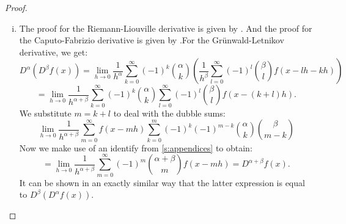 \begin{proof}
\begin{enumerate}[(i)]
        \item The proof for the Riemann-Liouville derivative is given by \cite{koning15}. And the proof for the Caputo-Fabrizio derivative is given by \cite{losada15}.For the Grünwald-Letnikov derivative, we get:
        \[ D^\alpha(D^\beta f(x)) = \lim_{h \to 0} \frac{1}{h^\alpha} \sum_{k=0}^\infty (-1)^k \binom{\alpha}{k}(  \frac{1}{h^\beta} \sum_{l=0}^\infty (-1)^l \binom{\beta}{l} f(x - l h - kh))\]
        \[= \lim_{h \to 0} \frac{1}{h^{\alpha + \beta}} \sum_{k=0}^\infty (-1)^k \binom{\alpha}{k} \sum_{l=0}^\infty (-1)^l \binom{\beta}{l} f(x - (k + l)h).\] We substitute \(m = k + l\) to deal with the dubble sums: 
        \[ \lim_{h \to 0} \frac{1}{h^{\alpha + \beta}} \sum_{m=0}^\infty f(x - mh)  \sum_{k=0}^m (-1)^k (-1)^{ m - k} \binom{\alpha}{k} \binom{\beta}{m - k}\] Now we make use of an identify from \ref{s:appendices} to obtain:
        \[ = \lim_{h \to 0} \frac{1}{h^{\alpha + \beta}} \sum_{m=0}^\infty (-1)^m \binom{\alpha + \beta}{m} f(x - mh) = D^{\alpha + \beta} f(x).\]
        It can be shown in an exactly similar way that the latter expression is equal to \(D^\beta(D^\alpha f(x))\).

        
    \end{enumerate}
\end{proof}


